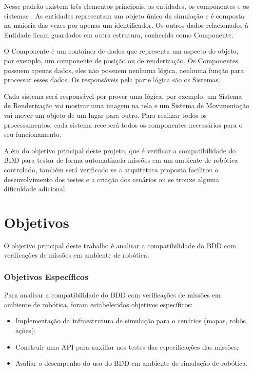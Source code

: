 Nesse padrão existem três elementos principais: as entidades, os componentes e os sistemas \cite{ecs_mmog_development}. As entidades representam um objeto único da simulação e é composta na maioria das vezes por apenas um identificador. Os outros dados relacionados à Entidade ficam guardados em outra estrutura, conhecida como Componente. 

O Componente é um container de dados que representa um aspecto do objeto, por exemplo, um componente de posição ou de renderização. Os Componentes possuem apenas dados, eles não possuem nenhuma lógica, nenhuma função para processar esses dados. Os responsáveis pela parte lógica são os Sistemas. 

Cada sistema será responsável por prover uma lógica, por exemplo, um Sistema de Renderização vai mostrar uma imagem na tela e um Sistema de Movimentação vai mover um objeto de um lugar para outro. Para realizar todos os processamentos, cada sistema receberá todos os componentes necessários para o seu funcionamento.  

Além do objetivo principal deste projeto, que é verificar a compatibilidade do BDD para testar de forma automatizada missões em um ambiente de robótica controlado, também será verificado se a arquitetura proposta facilitou o desenvolvimento dos testes e a criação dos cenários ou se trouxe alguma dificuldade adicional.

\section{Objetivos}


O objetivo principal deste trabalho é analisar a compatibilidade do BDD com verificações de missões em ambiente de robótica.
\subsubsection{Objetivos Específicos}


Para analisar a compatibilidade do BDD com verificações de missões em ambiente de robótica, foram estabelecidos objetivos específicos:

\begin{itemize}
    \item Implementação da infraestrutura de simulação para o cenários (mapas, robôs, ações);
    \item Construir uma API para auxiliar nos testes das especificações das missões;
    \item Avaliar o desempenho do uso do BDD em ambiente de simulação de robótica.
\end{itemize}